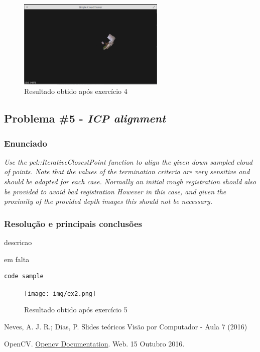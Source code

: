 \documentclass[portuguese, times, mirror]{revdetua}
\begin{document}
\begin{figure}[ht!]
\centering
\includegraphics[width=70mm]{img/ex4_3.png}
\caption{Resultado obtido após exercício 4}
\end{figure}



\subsection{Problema \#5 - \textit{ICP alignment}}

\subsubsection{Enunciado}
\textit{Use the pcl::IterativeClosestPoint function to align the given down sampled cloud of points. Note 
that the values of the termination criteria are very sensitive and should be adapted for each case.
Normally an initial rough registration should also be provided to avoid bad registration However in this
case, and given the proximity of the provided depth images this should not be necessary. }


\subsubsection{Resolução e principais conclusões}

descricao

em falta 

\begin{lstlisting}[caption=Função contagem dos cantos,label=code:C]
code sample
\end{lstlisting}

\begin{figure}[ht!]
\centering
\texttt{[image: img/ex2.png]}
\caption{Resultado obtido após exercício 5}
\end{figure}



\begin{thebibliography}{1} %



Neves, A. J. R.; Dias, P. Slides teóricos Visão por Computador - Aula 7 (2016)


OpenCV. \href{hhttp://docs.opencv.org/}{Opencv Documentation}. Web. 15 Outubro 2016. 




\end{thebibliography}
\end{document}
